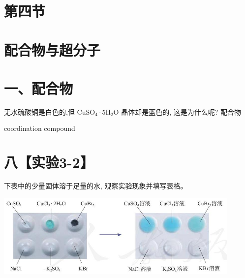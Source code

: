 \documentclass[10pt]{article}
\begin{document}
\section*{第四节}

\section*{配合物与超分子}

\section*{一、配合物}

无水硫酸铜是白色的,但 \({\mathrm{{CuSO}}}_{4} \cdot 5{\mathrm{H}}_{2}\mathrm{O}\) 晶体却是蓝色的, 这是为什么呢? 配合物

coordination compound

\section*{八【实验3-2】}

下表中的少量固体溶于足量的水, 观察实验现象并填写表格。

\begin{center}
\end{center}

\begin{center}
\includegraphics[max width=0.9\textwidth]{images/0190e026-5a11-7df7-bd27-54d09026ba7a_98_743122.jpg}
\end{center}
\end{document}
